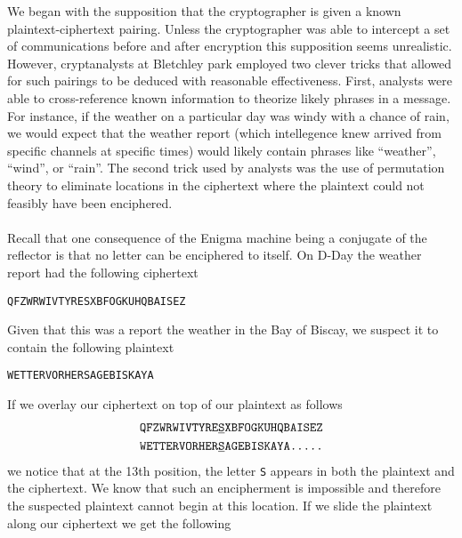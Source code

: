 We began with the supposition that the
cryptographer is given a known plaintext-ciphertext pairing. Unless
the cryptographer was able to intercept
a set of communications before and after encryption this supposition
seems unrealistic. However, cryptanalysts at Bletchley park
employed two clever tricks that allowed for such pairings to be
deduced with reasonable effectiveness. First, analysts were able to
cross-reference known information to theorize likely phrases in a
message. For instance, if the weather on a particular day was windy
with a chance of rain, we would expect that the weather report (which
intellegence knew arrived from specific channels at specific times)
would likely contain phrases like ``weather'', ``wind'', or ``rain''.
The second trick used by analysts was the use of permutation theory to
eliminate locations in the ciphertext where the plaintext could not
feasibly have been enciphered.
\\\\Recall that one consequence of the Enigma machine being a conjugate of the reflector is that no letter can be enciphered to itself. On D-Day the weather report had the following ciphertext
\begin{center}
	\texttt{QFZWRWIVTYRESXBFOGKUHQBAISEZ}
\end{center}
Given that this was a report the weather in the Bay of Biscay, we suspect it to contain the following plaintext
\begin{center}
	\texttt{WETTERVORHERSAGEBISKAYA}
\end{center}
If we overlay our ciphertext on top of our plaintext as follows
\begin{align*}
	 & \texttt{QFZWRWIVTYRE}{\uline{\texttt{S}}}\texttt{XBFOGKUHQBAISEZ} \\
	 & \texttt{WETTERVORHER}{\uline{\texttt{S}}}\texttt{AGEBISKAYA.....}
\end{align*}
we notice that at the 13th position, the letter \texttt{S} appears in both the plaintext and the ciphertext. We know that such an encipherment is impossible and therefore the suspected plaintext cannot begin at this location. If we slide the plaintext along our ciphertext we get the following
